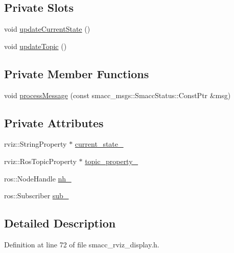 \subsection*{Private Slots}
\begin{DoxyCompactItemize}
\item 
void \hyperlink{classsmacc__rviz__plugin_1_1SmaccRvizDisplay_a6031090e46077a5e95754b5f70ea639a}{update\+Current\+State} ()
\item 
void \hyperlink{classsmacc__rviz__plugin_1_1SmaccRvizDisplay_adf332ae95bd83969b33ba713a60832fd}{update\+Topic} ()
\end{DoxyCompactItemize}
\subsection*{Private Member Functions}
\begin{DoxyCompactItemize}
\item 
void \hyperlink{classsmacc__rviz__plugin_1_1SmaccRvizDisplay_acc7281b99c92fa89f7494f6ca53e4905}{process\+Message} (const smacc\+\_\+msgs\+::\+Smacc\+Status\+::\+Const\+Ptr \&msg)
\end{DoxyCompactItemize}
\subsection*{Private Attributes}
\begin{DoxyCompactItemize}
\item 
rviz\+::\+String\+Property $\ast$ \hyperlink{classsmacc__rviz__plugin_1_1SmaccRvizDisplay_a342ff238c1dfaa427f09ee205a9e92d5}{current\+\_\+state\+\_\+}
\item 
rviz\+::\+Ros\+Topic\+Property $\ast$ \hyperlink{classsmacc__rviz__plugin_1_1SmaccRvizDisplay_ad81e5239e1343b2ba01ee16d1f010932}{topic\+\_\+property\+\_\+}
\item 
ros\+::\+Node\+Handle \hyperlink{classsmacc__rviz__plugin_1_1SmaccRvizDisplay_a077ef80f5698d21376b2d211f95ab73d}{nh\+\_\+}
\item 
ros\+::\+Subscriber \hyperlink{classsmacc__rviz__plugin_1_1SmaccRvizDisplay_abae6e8df8428a072d1de2c59dd4f9cd4}{sub\+\_\+}
\end{DoxyCompactItemize}


\subsection{Detailed Description}


Definition at line 72 of file smacc\+\_\+rviz\+\_\+display.\+h.



